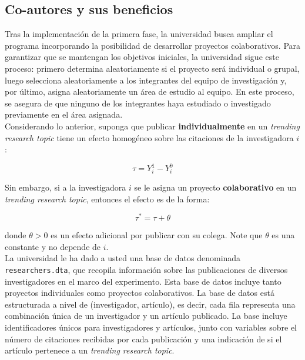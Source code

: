 \documentclass[a4paper, answers, addpoints, 11pt]{exam}
\begin{document}
\subsection*{Co-autores y sus beneficios}

Tras la implementación de la primera fase, la universidad busca ampliar el programa incorporando la posibilidad de desarrollar proyectos colaborativos. Para garantizar que se mantengan los objetivos iniciales, la universidad sigue este proceso: primero determina aleatoriamente si el proyecto será individual o grupal, luego selecciona aleatoriamente a los integrantes del equipo de investigación y, por último, asigna aleatoriamente un área de estudio al equipo. En este proceso, se asegura de que ninguno de los integrantes haya estudiado o investigado previamente en el área asignada. \\

Considerando lo anterior, suponga que publicar \textbf{individualmente} en un \textit{trending research topic} tiene un efecto homogéneo sobre las citaciones de la investigadora $i$:

\begin{equation*}
    \tau = Y^{1}_{i} - Y^{0}_{i}
\end{equation*}

 Sin embargo, si a la investigadora $i$ se le asigna un proyecto \textbf{colaborativo} en un \textit{trending research topic}, entonces el efecto es de la forma:

\begin{equation*}
    \tau^* = \tau + \theta 
\end{equation*}

donde $\theta > 0$ es un efecto adicional por publicar con su colega. Note que $\theta$ es una constante y no depende de $i$. \\

La universidad le ha dado a usted una base de datos denominada \texttt{researchers.dta}, que recopila información sobre las publicaciones de diversos investigadores en el marco del experimento. Esta base de datos incluye tanto proyectos individuales como proyectos colaborativos. La base de datos está estructurada a nivel de (investigador, artículo), es decir, cada fila representa una combinación única de un investigador y un artículo publicado. La base incluye identificadores únicos para investigadores y artículos, junto con variables sobre el número de citaciones recibidas por cada publicación y una indicación de si el artículo pertenece a un \textit{trending research topic}.
\end{document}
